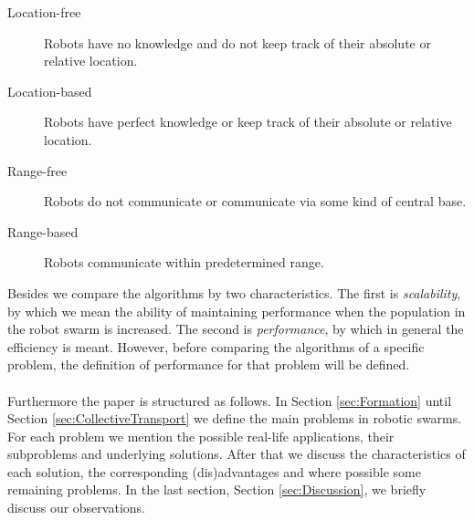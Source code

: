 \begin{description}
	\item[Location-free] Robots have no knowledge and do not keep track of their absolute or relative location.
	\item[Location-based] Robots have perfect knowledge or keep track of their absolute or relative location.
	\item[Range-free] Robots do not communicate or communicate via some kind of central base.
	\item[Range-based] Robots communicate within predetermined range.
\end{description}
Besides we compare the algorithms by two characteristics. The first is \emph{scalability}, by which we mean the ability of maintaining performance when the population in the robot swarm is increased. The second is \emph{performance}, by which in general the efficiency is meant. However, before comparing the algorithms of a specific problem, the definition of performance for that problem will be defined.\\
\\
Furthermore the paper is structured as follows. 
In Section \ref{sec:Formation} until Section \ref{sec:CollectiveTransport} we define the main problems in robotic swarms. 
For each problem we mention the possible real-life applications, their subproblems and underlying solutions.
After that we discuss the characteristics of each solution, the corresponding (dis)advantages and where possible some remaining problems.
In the last section, Section \ref{sec:Discussion}, we briefly discuss our observations.

% 

